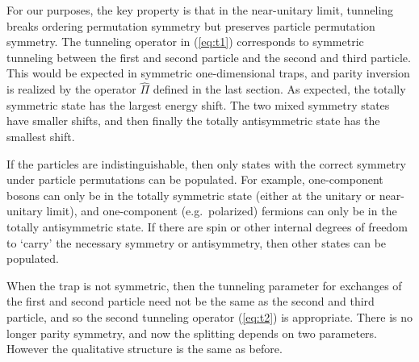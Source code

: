 For our purposes, the key property is that in the near-unitary limit, tunneling breaks ordering permutation symmetry but preserves particle permutation symmetry. The tunneling operator in (\ref{eq:t1}) corresponds to symmetric tunneling between the first and second particle and the second and third particle. This would be expected in symmetric one-dimensional traps, and parity inversion is realized by the operator $\hat{\Pi}$ defined in the last section. As expected, the totally symmetric state has the largest energy shift. The two mixed symmetry states have smaller shifts, and then finally the totally antisymmetric state has the smallest shift. 

If the particles are indistinguishable, then only states with the correct symmetry under particle permutations can be populated. For example, one-component bosons can only be in the totally symmetric state (either at the unitary or near-unitary limit), and one-component (e.g.\ polarized) fermions can only be in the totally antisymmetric state. If there are spin or other internal degrees of freedom to `carry' the necessary symmetry or antisymmetry, then other states can be populated.

When the trap is not symmetric, then the tunneling parameter for exchanges of the first and second particle need not be the same as the second and third particle, and so the second tunneling operator (\ref{eq:t2}) is appropriate. There is no longer parity symmetry, and now the splitting depends on two parameters. However the qualitative structure is the same as before.

